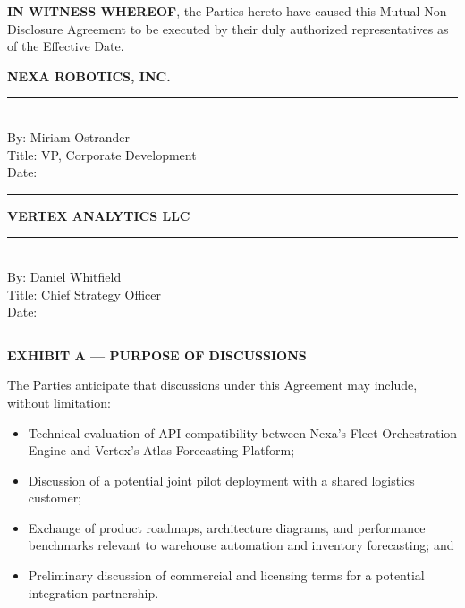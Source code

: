 \vspace{1.5em}

\textbf{IN WITNESS WHEREOF}, the Parties hereto have caused this Mutual Non-Disclosure Agreement to be executed by their duly authorized representatives as of the Effective Date.

\vspace{2.5em}

\begin{minipage}[t]{0.45\textwidth}
  \textbf{NEXA ROBOTICS, INC.} \\

  \vspace{3em}
  \rule{2.2in}{0.5pt} \\
  By: Miriam Ostrander \\
  Title: VP, Corporate Development \\
  Date: \rule{1.5in}{0.5pt}
\end{minipage}
\hfill
\begin{minipage}[t]{0.45\textwidth}
  \textbf{VERTEX ANALYTICS LLC} \\

  \vspace{3em}
  \rule{2.2in}{0.5pt} \\
  By: Daniel Whitfield \\
  Title: Chief Strategy Officer \\
  Date: \rule{1.5in}{0.5pt}
\end{minipage}

\par
\vspace{2.5em}

\begin{tcolorbox}[
  colback=mndabg,
  colframe=mndaborder,
  arc=1mm,
  leftrule=0pt,
  rightrule=0pt,
  toprule=0.5pt,
  bottomrule=0.5pt,
  boxsep=8pt,
  left=14pt,
  right=14pt,
  top=10pt,
  bottom=10pt
]
  {\sffamily\bfseries\color{mndanavy} EXHIBIT A --- PURPOSE OF DISCUSSIONS}

  \vspace{0.6em}
  \normalsize\normalfont
  The Parties anticipate that discussions under this Agreement may include, without limitation:

  \begin{itemize}
    \item Technical evaluation of API compatibility between Nexa's Fleet Orchestration Engine and Vertex's Atlas Forecasting Platform;
    \item Discussion of a potential joint pilot deployment with a shared logistics customer;
    \item Exchange of product roadmaps, architecture diagrams, and performance benchmarks relevant to warehouse automation and inventory forecasting; and
    \item Preliminary discussion of commercial and licensing terms for a potential integration partnership.
  \end{itemize}
\end{tcolorbox}
